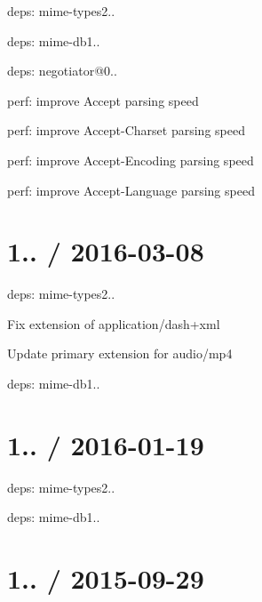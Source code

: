 
\begin{DoxyItemize}
\item deps\+: mime-\/types2..
\begin{DoxyItemize}
\item deps\+: mime-\/db1..
\end{DoxyItemize}
\item deps\+: negotiator@0..
\begin{DoxyItemize}
\item perf\+: improve {\ttfamily Accept} parsing speed
\item perf\+: improve {\ttfamily Accept-\/\+Charset} parsing speed
\item perf\+: improve {\ttfamily Accept-\/\+Encoding} parsing speed
\item perf\+: improve {\ttfamily Accept-\/\+Language} parsing speed
\end{DoxyItemize}
\end{DoxyItemize}

\section*{1.. / 2016-\/03-\/08 }


\begin{DoxyItemize}
\item deps\+: mime-\/types2..
\begin{DoxyItemize}
\item Fix extension of {\ttfamily application/dash+xml}
\item Update primary extension for {\ttfamily audio/mp4}
\item deps\+: mime-\/db1..
\end{DoxyItemize}
\end{DoxyItemize}

\section*{1.. / 2016-\/01-\/19 }


\begin{DoxyItemize}
\item deps\+: mime-\/types2..
\begin{DoxyItemize}
\item deps\+: mime-\/db1..
\end{DoxyItemize}
\end{DoxyItemize}

\section*{1.. / 2015-\/09-\/29 }


